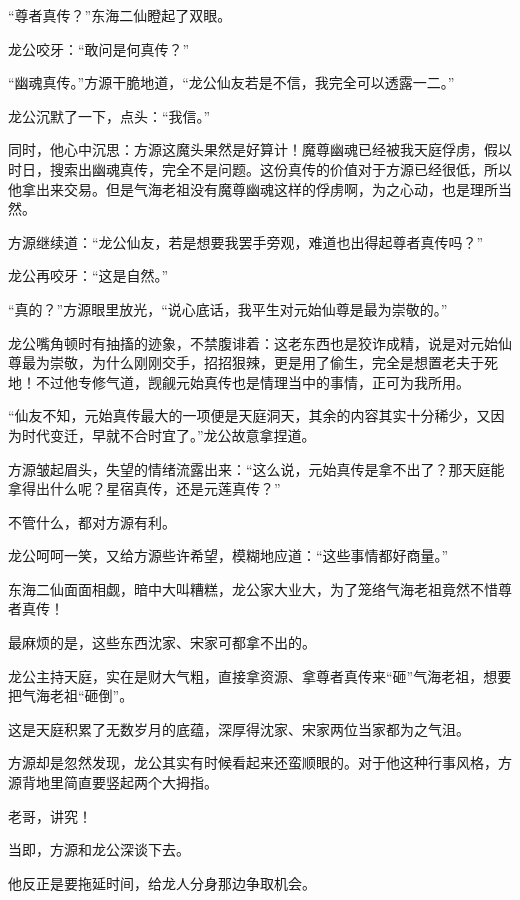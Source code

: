 
\begin{this_body}

“尊者真传？”东海二仙瞪起了双眼。

龙公咬牙：“敢问是何真传？”

“幽魂真传。”方源干脆地道，“龙公仙友若是不信，我完全可以透露一二。”

龙公沉默了一下，点头：“我信。”

同时，他心中沉思：方源这魔头果然是好算计！魔尊幽魂已经被我天庭俘虏，假以时日，搜索出幽魂真传，完全不是问题。这份真传的价值对于方源已经很低，所以他拿出来交易。但是气海老祖没有魔尊幽魂这样的俘虏啊，为之心动，也是理所当然。

方源继续道：“龙公仙友，若是想要我罢手旁观，难道也出得起尊者真传吗？”

龙公再咬牙：“这是自然。”

“真的？”方源眼里放光，“说心底话，我平生对元始仙尊是最为崇敬的。”

龙公嘴角顿时有抽搐的迹象，不禁腹诽着：这老东西也是狡诈成精，说是对元始仙尊最为崇敬，为什么刚刚交手，招招狠辣，更是用了偷生，完全是想置老夫于死地！不过他专修气道，觊觎元始真传也是情理当中的事情，正可为我所用。

“仙友不知，元始真传最大的一项便是天庭洞天，其余的内容其实十分稀少，又因为时代变迁，早就不合时宜了。”龙公故意拿捏道。

方源皱起眉头，失望的情绪流露出来：“这么说，元始真传是拿不出了？那天庭能拿得出什么呢？星宿真传，还是元莲真传？”

不管什么，都对方源有利。

龙公呵呵一笑，又给方源些许希望，模糊地应道：“这些事情都好商量。”

东海二仙面面相觑，暗中大叫糟糕，龙公家大业大，为了笼络气海老祖竟然不惜尊者真传！

最麻烦的是，这些东西沈家、宋家可都拿不出的。

龙公主持天庭，实在是财大气粗，直接拿资源、拿尊者真传来“砸”气海老祖，想要把气海老祖“砸倒”。

这是天庭积累了无数岁月的底蕴，深厚得沈家、宋家两位当家都为之气沮。

方源却是忽然发现，龙公其实有时候看起来还蛮顺眼的。对于他这种行事风格，方源背地里简直要竖起两个大拇指。

老哥，讲究！

当即，方源和龙公深谈下去。

他反正是要拖延时间，给龙人分身那边争取机会。


\end{this_body}
